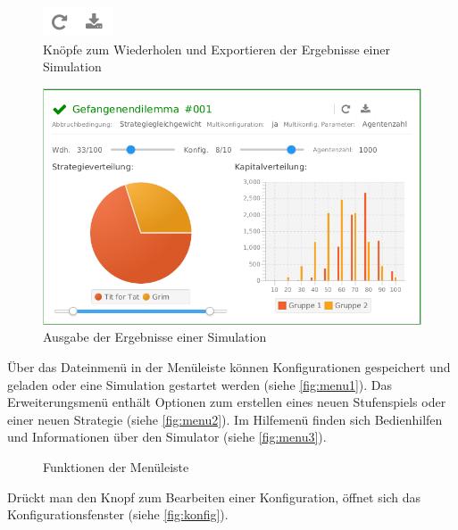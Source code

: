 \documentclass[parskip=full,11pt]{scrartcl}
\begin{document}
\begin{figure}[ht]
	\centering
	\includegraphics{images/out_btn.png}
	\caption{\label{fig:out_btn}
		Knöpfe zum Wiederholen und Exportieren der Ergebnisse einer Simulation}
\end{figure}
\begin{figure}[ht]
	\centering
	\includegraphics[width=\textwidth]{images/home_output.png}
	\caption{\label{fig:home_output}
		Ausgabe der Ergebnisse einer Simulation}
\end{figure}
\newpage
Über das Dateinmenü in der Menüleiste können Konfigurationen gespeichert und geladen oder eine Simulation gestartet werden (siehe \cref{fig:menu1}).
Das Erweiterungsmenü enthält Optionen zum erstellen eines neuen Stufenspiels oder einer neuen Strategie (siehe \cref{fig:menu2}). Im Hilfemenü finden sich Bedienhilfen und Informationen über den Simulator (siehe \cref{fig:menu3}).

\begin{figure}[ht]
	\centering
	\qquad
	\qquad
	\caption{\label{fig:menu}
		Funktionen der Menüleiste
	}
\end{figure}
\newpage
Drückt man den Knopf zum Bearbeiten einer Konfiguration, öffnet sich das Konfigurationsfenster (siehe \cref{fig:konfig}).
\end{document}
